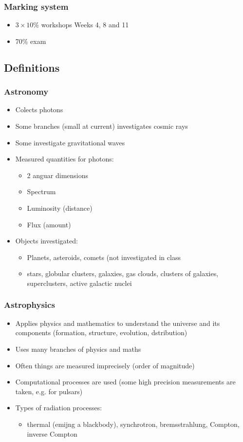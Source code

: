 \documentclass[a4paper]{article} %
\begin{document}
\subsubsection{Marking system}
\begin{itemize}
\item $3 \times 10\%$ workshops Weeks 4, 8 and 11
\item 70\% exam
\end{itemize}

\subsection{Definitions}
\subsubsection{Astronomy}
\begin{itemize}
\item Colects photons
\item Some branches (small at current) investigates cosmic rays
\item Some investigate gravitational waves
\item Measured quantities for photons:
\begin{itemize}
\item 2 anguar dimensions
\item Spectrum
\item Luminosity (distance)
\item Flux (amount)
\end{itemize}
\item Objects investigated:
\begin{itemize}
\item Planets, asteroids, comets (not investigated in class
\item stars, globular clusters, galaxies, gas clouds,
clusters of galaxies, superclusters, active galactic nuclei
\end{itemize}
\end{itemize}

\subsubsection{Astrophysics}
\begin{itemize}
\item Applies physics and mathematics to understand the universe and its components (formation, structure, evolution, dstribution)
\item Uses many branches of physics and maths
\item Often things are measured imprecisely (order of magnitude)
\item Computational processes are used (some high precision measurements are taken, e.g. for pulsars)
\item Types of radiation processes:
\begin{itemize}
\item thermal (emijng a blackbody), synchrotron,
bremsstrahlung, Compton, inverse Compton
\end{itemize}
\end{itemize}
\end{document}
